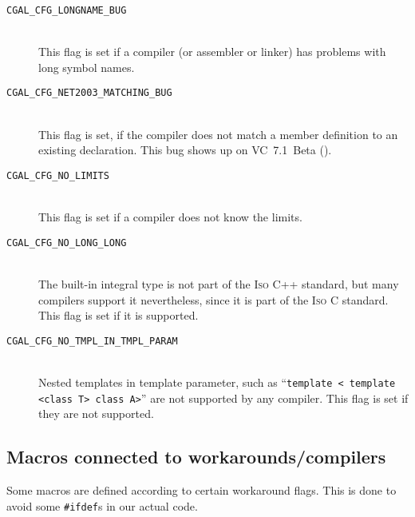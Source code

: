 \begin{description}
\item[{\tt CGAL\_CFG\_LONGNAME\_BUG}]~\\
 This flag is set if a compiler (or assembler or linker) has problems 
 with long symbol names. 

\item[{\tt CGAL\_CFG\_NET2003\_MATCHING\_BUG}]~\\
 This flag is set, if the compiler does not match a member definition
 to an existing declaration. This bug shows up on VC~7.1~Beta
 ().

\item[{\tt CGAL\_CFG\_NO\_LIMITS}]~\\
  This flag is set if a compiler does not know the limits.

\item[{\tt CGAL\_CFG\_NO\_LONG\_LONG}]~\\
  The  built-in integral type is not part of the
  \textsc{Iso} C++ standard, but many compilers support it
  nevertheless, since it is part of the \textsc{Iso} C standard. This
  flag is set if it is supported.
  
\item[{\tt CGAL\_CFG\_NO\_TMPL\_IN\_TMPL\_PARAM}]~\\
  Nested templates in template parameter, such as ``\texttt{template <
    template <class T> class A>}'' are not supported by any compiler.
  This flag is set if they are not supported.

\end{description}

\subsection{Macros connected to workarounds/compilers\label{sec:workaround_macros}}

Some macros are defined according to certain workaround flags. This is
done to avoid some \texttt{\#ifdef}s in our actual code.

